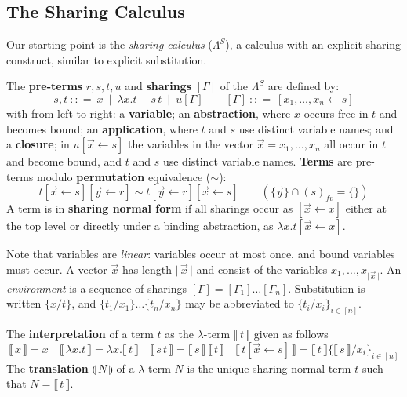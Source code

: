 \documentclass[a4paper,UKenglish,cleveref, autoref]{lipics-v2019}
\newcommand\defn{\textbf}
\newcommand{\SLC}{\Lambda^{S}}
\newcommand{\fv}[1]{(#1)_{fv}}
\newcommand{\set}[1]{ \{ #1 \} }
\newcommand{\abs}[2]{\lambda #1 . #2}
\newcommand{\app}[2]{#1 \, #2}
\newcommand{\share}[3]{#1 [#2 \leftarrow #3]}
\newcommand{\size}[1]{\vert \, #1 \, \vert}
\newcommand{\sub}[3]{#1 \{ #2 / #3 \}}
\newcommand{\compile}[1]{\llparenthesis \, #1 \, \rrparenthesis}
\newcommand{\readbackclose}[1]{\llbracket \, #1 \, \rrbracket }
\begin{document}
\subsection{The Sharing Calculus}

Our starting point is the \emph{sharing calculus} ($\SLC$), a calculus with an explicit sharing construct, similar to explicit substitution.

\begin{definition}
\label{def:sharingcalsyntax}
The \defn{pre-terms} $r,s,t,u$ and \defn{sharings} $[\Gamma]$ of the $\SLC$ are defined by:
\[
	s,t 
	~{:}{:}{=}~ x 
	~\mid~ \abs xt 
	~\mid~ \app st 
	~\mid~ u[\Gamma] 
\qquad
	[\Gamma] ~{:}{:}{=}~ \share{}{x_{1}, \dots, x_{n}}{s}
\]
with from left to right: a \defn{variable}; an \defn{abstraction}, where $x$ occurs free in $t$ and becomes bound; an \defn{application}, where $t$ and $s$ use distinct variable names; and a \defn{closure}; in $\share{u}{\vec{x}}{s}$ the variables in the vector $\vec{x} = x_{1}, \dots, x_{n}$ all occur in $t$ and become bound, and $t$ and $s$ use distinct variable names. \defn{Terms} are pre-terms modulo \defn{permutation} equivalence ($\sim$):
\[
	\share{t}{\vec{x}}{s} \share{}{\vec{y}}{r} \sim t \share{}{\vec{y}}{r} \share{}{\vec{x}}{s} \quad \quad (\set{\vec{y}} \cap \fv{s} = \set{} )
\]
A term is in \defn{sharing normal form} if all sharings occur as $\share{}{\vec{x}}{x}$ either at the top level or directly under a binding abstraction, as $\abs{x}{\share{t}{\vec{x}}{x}}$.
\end{definition}

\noindent Note that variables are \emph{linear}: variables occur at most once, and bound variables must occur. A vector $\vec{x}$ has length $\size{\vec{x}}$ and consist of the variables $x_{1}, \dots, x_{\size{\vec{x}}}$. An \emph{environment} is a sequence of sharings $\overline{[\Gamma]} = [\Gamma_{1}] \dots [\Gamma_{n}]$. Substitution is written $\sub{}{x}{t}$, and $\sub{}{t_{1}}{x_{1}} \dots \sub{}{t_{n}}{x_{n}}$ may be abbreviated to $\sub{}{t_{i}}{x_{i}}_{i \in [n]}$.

\begin{definition}
The \defn{interpretation} of a term $t$ as the $\lambda$-term $\readbackclose{t}$ given as follows
$$\readbackclose{x} = x \quad \readbackclose{\abs{x}{t}} = \abs{x}{\readbackclose{t}} \quad \readbackclose{\app{s}{t}} = \app{\readbackclose{s}}{\readbackclose{t}} \quad \readbackclose{\share{t}{\vec{x}}{s}} = \readbackclose{t} \sub{}{\readbackclose{s}}{x_{i}}_{i \in [n]}$$
The \defn{translation} $\compile{N}$ of a $\lambda$-term $N$ is the unique sharing-normal term $t$ such that $N = \readbackclose{t}$.
\end{definition}
\end{document}
